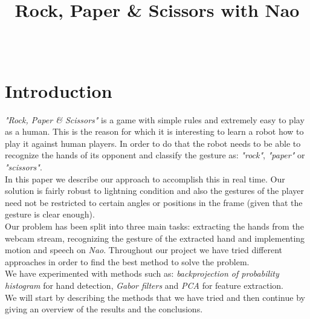 \documentclass[a4paper, 11pt, twocolumn]{article}
\date{} %
\author{\fade{Nimrod Raiman [0336696]}\\\fade{Silvia L. Pintea [6109960]}}
\title{Rock, Paper \& Scissors with Nao}
\begin{document}
    \maketitle
    \section{Introduction}
	\label{sec:intro}
        \emph{"Rock, Paper \& Scissors"} is a game with simple rules and extremely easy to play as a human. This is the reason for which it is interesting to learn a robot how to play it against human players. In order to do that the robot needs to be able to recognize the hands of its opponent and classify the gesture as: \emph{"rock"}, \emph{"paper"} or \emph{"scissors"}.\\	
		\hspace*{10px}In this paper we describe our approach to accomplish this in real time. Our solution is fairly robust to lightning condition and also the gestures of the player need not be restricted to certain angles or positions in the frame (given that the gesture is clear enough).\\ 
        \hspace*{10px}Our problem has been split into three main tasks: extracting the hands from the webcam stream, recognizing the gesture of the extracted hand and implementing motion and speech on \emph{Nao}. Throughout our project we have tried different approaches in order to find the best method to solve the problem.\\
		 \hspace*{10px}We have experimented with methods such as: \emph{backprojection of probability histogram} for hand detection, \emph{Gabor filters} and \emph{PCA} for feature extraction.\\
		 \hspace*{10px}We will start by describing the methods that we have tried and then continue by giving an overview of the results and the conclusions.   
\end{document}
